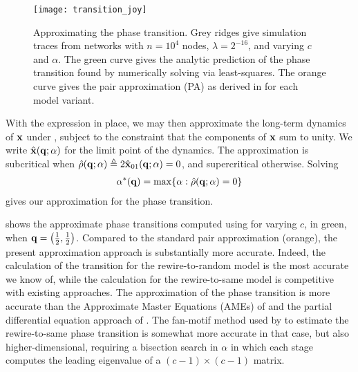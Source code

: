 \documentclass[review, onefignum, onetabnum]{siamart171218}
\begin{document}
		
		
		\begin{figure}
			\centering
				\texttt{[image: transition\_joy]}
			\caption{Approximating the phase transition. 
			Grey ridges give simulation traces from networks with $n = 10^4$ nodes, $\lambda = 2^{-16}$, and varying $c$ and $\alpha$. 
			The green curve gives the analytic prediction of the phase transition found by numerically solving  via least-squares. 
			The orange curve gives the pair approximation (PA) as derived in \cite{Durrett2012} for each model variant.}
			\label{fig:transition_joy}
		\end{figure}

		With the expression  in place, we may then approximate the long-term dynamics of $\mathbf{x}$ under , subject to the constraint that the components of $\mathbf{x}$ sum to unity. 
		We write $\hat{\mathbf{x}}(\mathbf{q}; \alpha)$ for the limit point of the dynamics. 
		The approximation is subcritical when $\hat{\rho}(\mathbf{q}; \alpha) \triangleq 2\hat{\mathbf{x}}_{01}(\mathbf{q}; \alpha) = 0$, and supercritical otherwise. 
		Solving 
		\begin{align}
			\alpha^*(\q) = \max \{\alpha : \hat{\rho}(\q; \alpha) = 0\} \label{eq:transition_approx}
		\end{align}
		gives our approximation for the phase transition. 

		 shows the approximate phase transitions computed using  for varying $c$, in green, when $\mathbf{q} = \left(\frac{1}{2}, \frac{1}{2}\right)$. %
		Compared to the standard pair approximation (orange), the present approximation approach is substantially more accurate.
		Indeed, the calculation of the transition for the rewire-to-random model is the most accurate we know of, while the calculation for the rewire-to-same model is competitive with existing approaches.
		The approximation of the phase transition is more accurate than the Approximate Master Equations (AMEs) of \cite{Durrett2012} and the partial differential equation approach of \cite{Silk2014}. 
		The fan-motif method used by \cite{Bohme2011} to estimate the rewire-to-same phase transition is somewhat more accurate in that case, but also higher-dimensional, requiring a bisection search in $\alpha$ in which each stage computes the leading eigenvalue of a $(c-1)\times (c-1)$ matrix. 
\end{document}

